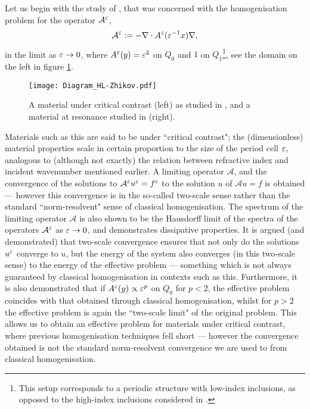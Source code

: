 Let us begin with the study of \cite{zhikov2000extension}, that was concerned with the homogenisation problem for the operator $\mathcal{A}^{\varepsilon}$,
\begin{align*}
	\mathcal{A}^{\varepsilon} := -\nabla\cdot A^{\varepsilon}(\varepsilon^{-1}x)\nabla,
\end{align*}
in the limit as $\varepsilon\rightarrow0$, where $A^{\varepsilon}(y)=\varepsilon^2$ on $Q_0$ and $1$ on $Q_1$\footnote{This setup corresponds to a periodic structure with low-index inclusions, as opposed to the high-index inclusions considered in \cite{movchan2001noncommuting} .}, see the domain on the left in figure \ref{fig:Diagram_HL-Zhikov}.
\begin{figure}[b]
	\centering
	\texttt{[image: Diagram\_HL-Zhikov.pdf]}
	\caption[Relation between materials under critical contrast and at resonance.]{\label{fig:Diagram_HL-Zhikov} A material under critical contrast (left) as studied in \cite{zhikov2000extension}, and a material at resonance studied in \cite{hempel2000spectral} (right).}
\end{figure}
Materials such as this are said to be under ``critical contrast"; the (dimensionless) material properties scale in certain proportion to the size of the period cell $\varepsilon$, analogous to (although not exactly) the relation between refractive index and incident wavenumber mentioned earlier.
A limiting operator $\mathcal{A}$, and the convergence of the solutions to $\mathcal{A}^{\varepsilon}u^{\varepsilon}=f^{\varepsilon}$ to the solution $u$ of $\mathcal{A}u=f$ is obtained --- however this convergence is in the so-called two-scale sense rather than the standard ``norm-resolvent" sense of classical homogenisation.
The spectrum of the limiting operator $\mathcal{A}$ is also shown to be the Hausdorff limit of the spectra of the operators $\mathcal{A}^{\varepsilon}$ as $\varepsilon\rightarrow0$, and demonstrates dissipative properties.
It is argued (and demonstrated) that two-scale convergence ensures that not only do the solutions $u^{\varepsilon}$ converge to $u$, but the energy of the system also converges (in this two-scale sense) to the energy of the effective problem --- something which is not always guaranteed by classical homogenisation in contexts such as this. 
Furthermore, it is also demonstrated that if $A^{\varepsilon}(y)\propto\varepsilon^p$ on $Q_0$ for $p<2$, the effective problem coincides with that obtained through classical homogenisation, whilst for $p>2$ the effective problem is again the ``two-scale limit" of the original problem.
This allows us to obtain an effective problem for materials under critical contrast, where previous homogenisation techniques fell short --- however the convergence obtained is not the standard norm-resolvent convergence we are used to from classical homogenisation.

